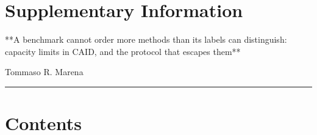 
\section*{Supplementary Information}

**A benchmark cannot order more methods than its labels can distinguish:
capacity limits in CAID, and the protocol that escapes them**

Tommaso R. Marena


\vspace{0.5em}\hrule\vspace{0.8em}



\section*{Contents}

